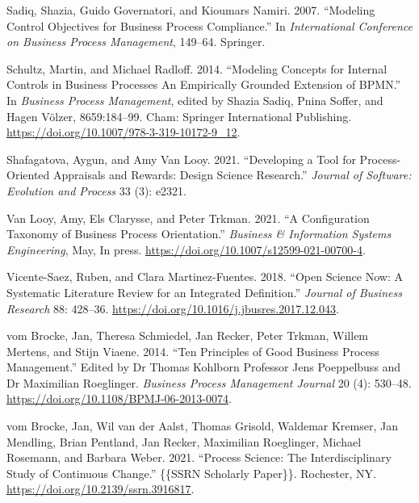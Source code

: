 \documentclass[
  letterpaper,
  DIV=11,
  numbers=noendperiod]{scrreprt}
\newlength{\cslhangindent}
\newlength{\cslentryspacingunit} %
\newenvironment{CSLReferences}[2] %
 {%
  \setlength{\parindent}{0pt}
  \ifodd #1
  \let\oldpar\par
  \def\par{\hangindent=\cslhangindent\oldpar}
  \fi
  \setlength{\parskip}{#2\cslentryspacingunit}
 }%
 {}
\begin{document}
\begin{CSLReferences}{1}{0}
\leavevmode{}%
Sadiq, Shazia, Guido Governatori, and Kioumars Namiri. 2007. {``Modeling
Control Objectives for Business Process Compliance.''} In
\emph{International Conference on Business Process Management}, 149--64.
{Springer}.

\leavevmode{}%
Schultz, Martin, and Michael Radloff. 2014. {``Modeling {Concepts} for
{Internal Controls} in {Business Processes} \textendash{} {An
Empirically Grounded Extension} of {BPMN}.''} In \emph{Business {Process
Management}}, edited by Shazia Sadiq, Pnina Soffer, and Hagen Völzer,
8659:184--99. {Cham}: {Springer International Publishing}.
\url{https://doi.org/10.1007/978-3-319-10172-9_12}.

\leavevmode{}%
Shafagatova, Aygun, and Amy Van Looy. 2021. {``Developing a Tool for
Process-Oriented Appraisals and Rewards: {Design} Science Research.''}
\emph{Journal of Software: Evolution and Process} 33 (3): e2321.

\leavevmode{}%
Van Looy, Amy, Els Clarysse, and Peter Trkman. 2021. {``A {Configuration
Taxonomy} of {Business Process Orientation}.''} \emph{Business \&
Information Systems Engineering}, May, In press.
\url{https://doi.org/10.1007/s12599-021-00700-4}.

\leavevmode{}%
Vicente-Saez, Ruben, and Clara Martinez-Fuentes. 2018. {``Open {Science}
Now: {A} Systematic Literature Review for an Integrated Definition.''}
\emph{Journal of Business Research} 88: 428--36.
\url{https://doi.org/10.1016/j.jbusres.2017.12.043}.

\leavevmode{}%
vom Brocke, Jan, Theresa Schmiedel, Jan Recker, Peter Trkman, Willem
Mertens, and Stijn Viaene. 2014. {``Ten Principles of Good Business
Process Management.''} Edited by Dr Thomas Kohlborn Professor Jens
Poeppelbuss and Dr Maximilian Roeglinger. \emph{Business Process
Management Journal} 20 (4): 530--48.
\url{https://doi.org/10.1108/BPMJ-06-2013-0074}.

\leavevmode{}%
vom Brocke, Jan, Wil van der Aalst, Thomas Grisold, Waldemar Kremser,
Jan Mendling, Brian Pentland, Jan Recker, Maximilian Roeglinger, Michael
Rosemann, and Barbara Weber. 2021. {``Process {Science}: {The
Interdisciplinary Study} of {Continuous Change}.''} \{\{SSRN Scholarly
Paper\}\}. {Rochester, NY}. \url{https://doi.org/10.2139/ssrn.3916817}.


\end{CSLReferences}
\end{document}
